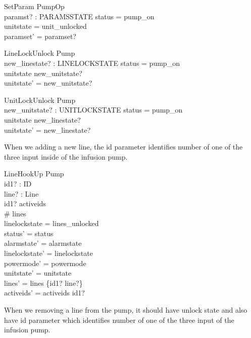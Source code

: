 \documentclass{article}
\begin{document}
	\begin{schema}{SetParam}
		PumpOp \\
		paramst? : PARAMSSTATE 
	\where
		status = pump\_on \\ 
		unitstate = unit\_unlocked \\
		paramset' = paramset?
	\end{schema}

    \begin{schema}{LineLockUnlock}
		\Delta Pump \\
		new\_linestate? : LINELOCKSTATE
	\where
		status = pump\_on \\ 
		unitstate \neq new\_unitstate? \\
		unitstate' = new\_unitstate? \\		
	\end{schema}
	
    \begin{schema}{UnitLockUnlock}
		\Delta Pump \\
		new\_unitstate? : UNITLOCKSTATE
	\where
		status = pump\_on \\ 
		unitstate \neq new\_linestate? \\
		unitstate' = new\_linestate? \\
	\end{schema} 	
	
	When we adding a new line, the id parameter identifies number of 
	one of the three input inside of the infusion pump.

	\begin{schema}{LineHookUp}
		\Delta Pump \\
		id1? : ID \\
		line? : Line \\
	\where
		id1? \notin activeids \\
		\# lines  \\
		linelockstate = lines\_unlocked \\
		status' = status \\
		alarmstate' = alarmstate \\
		linelockstate' = linelockstate \\
		powermode' =  powermode \\
		unitstate' = unitstate \\
		lines' = lines \cup \{id1? \mapsto line?\} \\
		activeids' = activeids \cup id1?
	\end{schema}

	When we removing a line from the pump, it should have unlock state
	and also have id parameter which identifies number of one of the
	three input of the infusion pump.
	
\end{document}
